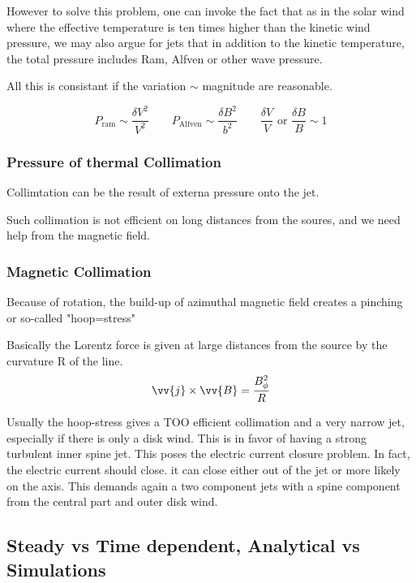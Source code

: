 \documentclass[10pt,a4paper,english,draft]{article}
\begin{document}
However to solve this problem, one can invoke the fact that as in the solar wind where the
effective temperature is ten times higher than the kinetic wind pressure, we may also argue
for jets that in addition to the kinetic temperature, the total pressure includes Ram, Alfven
or other wave pressure.


All this is consistant if the variation $\sim$ magnitude are reasonable.

\begin{equation}
P_\mathrm{ram} \sim \frac{\delta V^2}{V^2} \qquad
P_\mathrm{Alfven}	\sim \frac{\delta B^2}{b^2} \qquad
\frac{\delta V}{V } \text{ or } \frac{\delta B}{B} \sim 1
\end{equation}
\subsubsection{Pressure of thermal Collimation}
Collimtation can be the result of externa pressure onto the jet.


Such collimation is not efficient on long distances from the soures, and we need help from the magnetic field.

\subsubsection{Magnetic Collimation}
Because of rotation, the build-up of azimuthal magnetic field creates a pinching or so-called "hoop=stress"


Basically the Lorentz force is given at large distances from the source by the curvature R of the line.
\begin{equation}
\vv{j} \times \vv{B} = \frac{B^2_{\phi}}{R}
\end{equation}

Usually the hoop-stress gives a TOO efficient collimation and a very narrow jet, especially if there is only a disk wind.
This is in favor of having a strong turbulent inner spine jet. This poses the electric current closure problem. In fact,
the electric current should close. it can close either out of the jet or more likely  on the axis. This demands again a
two component jets with a spine component  from the central part and outer disk wind.
\subsection{Steady vs Time dependent, Analytical vs Simulations}
\end{document}
